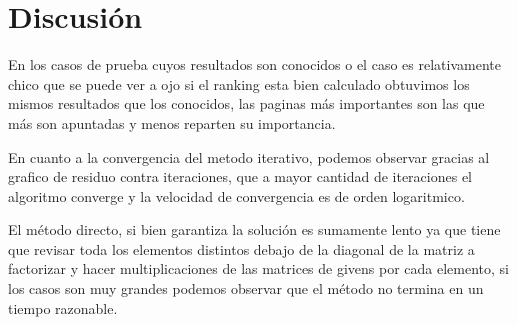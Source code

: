 \section{Discusión}

En los casos de prueba cuyos resultados son conocidos o el caso es relativamente chico que se puede ver a ojo si el ranking esta bien calculado obtuvimos los mismos resultados que los conocidos, las paginas más importantes son las que más son apuntadas y menos reparten su importancia. 

En cuanto a la convergencia del metodo iterativo, podemos observar gracias al grafico de residuo contra iteraciones, que a mayor cantidad de iteraciones el algoritmo converge y la velocidad de convergencia es de orden logaritmico. 

El método directo, si bien garantiza la solución es sumamente lento ya que tiene que revisar toda los elementos distintos debajo de la diagonal de la matriz a factorizar y hacer multiplicaciones de las matrices de givens por cada elemento, si los casos son muy grandes podemos observar que el método no termina en un tiempo razonable.